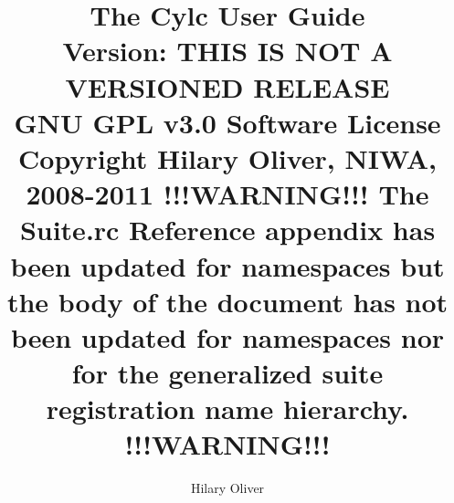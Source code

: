 \documentclass[titlepage]{article}
\begin{document}
\title{The Cylc User Guide \\
Version: THIS IS NOT A VERSIONED RELEASE \\
GNU GPL v3.0 Software License \\
Copyright Hilary Oliver, NIWA, 2008-2011
\linebreak
{\huge !!!WARNING!!!} \linebreak
{\large The Suite.rc Reference appendix has been updated for namespaces} \linebreak
{\large but the body of the document has not been updated for namespaces} \linebreak
{\large nor for the generalized suite registration name hierarchy. } \linebreak
{\huge !!!WARNING!!!} \linebreak
}

\author{Hilary Oliver}


\maketitle

%
%

\tableofcontents



\end{document}
